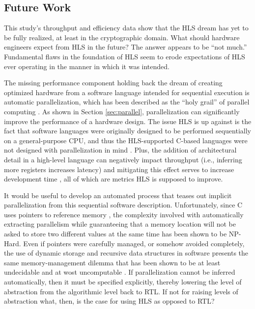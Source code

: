 \documentclass[12pt,journal,compsoc,onecolumn]{IEEEtran}
\begin{document}
\subsection{Future Work}\label{sec:future}
This study's throughput and efficiency data show that the HLS dream has yet to be fully realized, at least in the cryptographic domain. What should hardware engineers expect from HLS in the future? The answer appears to be ``not much.'' Fundamental flaws in the foundation of HLS seem to erode expectations of HLS ever operating in the manner in which it was intended.  

The missing performance component holding back the dream of creating optimized hardware from a software language intended for sequential execution is automatic parallelization, which has been described as the ``holy grail'' of parallel computing \cite{holygrail}. As shown in Section \ref{sec:parallel}, parallelization can significantly improve the performance of a hardware design. The issue HLS is up against is the fact that software languages were originally designed to be performed sequentially on a general-purpose CPU, and thus the HLS-supported C-based languages were not designed with parallelization in mind \cite{clanguage}. Plus, the addition of architectural detail in a high-level language can negatively impact throughput (i.e., inferring more registers increases latency) and mitigating this effect serves to increase development time \cite{bsv}, all of which are metrics HLS is supposed to improve. 

It would be useful to develop an automated process that teases out implicit parallelization from this sequential software description. Unfortunately, since C uses pointers to reference memory \cite{cpointers}, the complexity involved with automatically extracting parallelism while guaranteeing that a memory location will not be asked to store two different values at the same time has been shown to be NP-Hard\cite{aliasinghard}. Even if pointers were carefully managed, or somehow avoided completely, the use of dynamic storage and recursive data structures in software presents the same memory-management dilemma that has been shown to be at least undecidable and at wost uncomputable \cite{staticanalysis}. If parallelization cannot be inferred automatically, then it must be specified explicitly, thereby lowering the level of abstraction from the algorithmic level back to RTL\cite{wipliez}. If not for raising levels of abstraction what, then, is the case for using HLS as opposed to RTL?  
\end{document}
